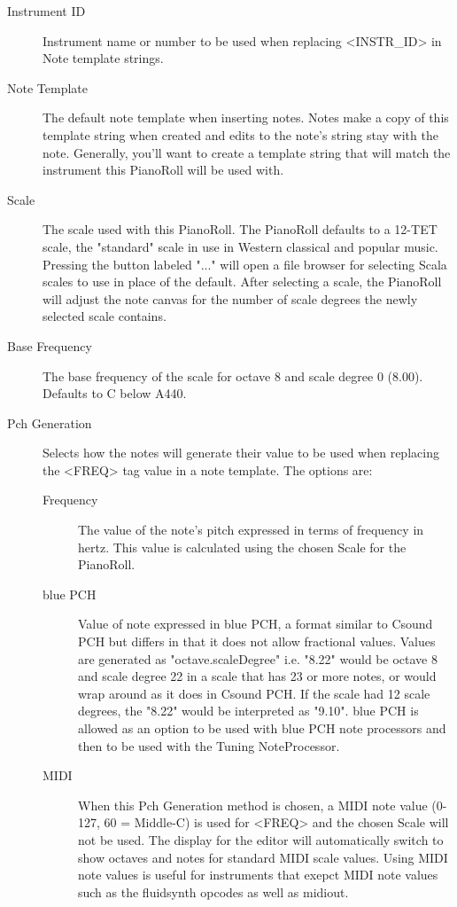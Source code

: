 \begin{description}
\item[Instrument ID]
Instrument name or number to be used when replacing
\textless{}INSTR\_ID\textgreater{} in Note template strings.
\item[Note Template]
The default note template when inserting notes. Notes make a copy of
this template string when created and edits to the note's string stay
with the note. Generally, you'll want to create a template string that
will match the instrument this PianoRoll will be used with.
\item[Scale]
The scale used with this PianoRoll. The PianoRoll defaults to a 12-TET
scale, the "standard" scale in use in Western classical and popular
music. Pressing the button labeled "..." will open a file browser for
selecting Scala scales to use in place of the default. After selecting a
scale, the PianoRoll will adjust the note canvas for the number of scale
degrees the newly selected scale contains.
\item[Base Frequency]
The base frequency of the scale for octave 8 and scale degree 0 (8.00).
Defaults to C below A440.
\item[Pch Generation]
Selects how the notes will generate their value to be used when
replacing the \textless{}FREQ\textgreater{} tag value in a note
template. The options are:

\begin{description}
\item[Frequency]
The value of the note's pitch expressed in terms of frequency in hertz.
This value is calculated using the chosen Scale for the PianoRoll.
\item[blue PCH]
Value of note expressed in blue PCH, a format similar to Csound PCH but
differs in that it does not allow fractional values. Values are
generated as "octave.scaleDegree" i.e. "8.22" would be octave 8 and
scale degree 22 in a scale that has 23 or more notes, or would wrap
around as it does in Csound PCH. If the scale had 12 scale degrees, the
"8.22" would be interpreted as "9.10". blue PCH is allowed as an option
to be used with blue PCH note processors and then to be used with the
Tuning NoteProcessor.
\item[MIDI]
When this Pch Generation method is chosen, a MIDI note value (0-127, 60
= Middle-C) is used for \textless{}FREQ\textgreater{} and the chosen
Scale will not be used. The display for the editor will automatically
switch to show octaves and notes for standard MIDI scale values. Using
MIDI note values is useful for instruments that exepct MIDI note values
such as the fluidsynth opcodes as well as midiout.
\end{description}
\end{description}


